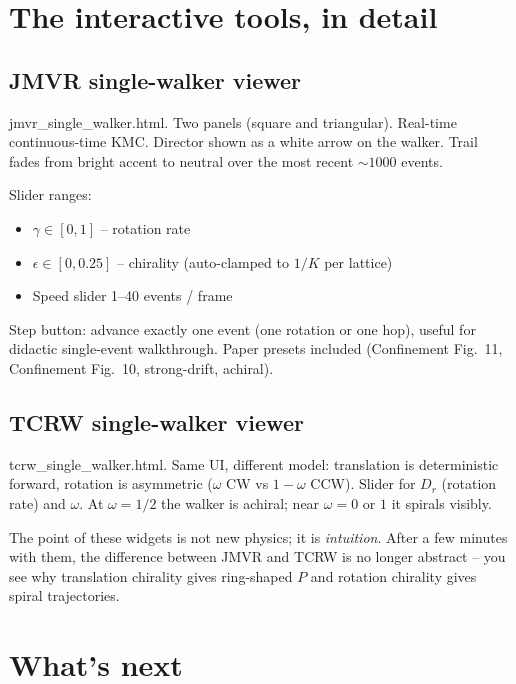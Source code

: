 \documentclass[11pt,a4paper]{article}
\begin{document}
\section{The interactive tools, in detail}\label{sec:widgets-detail}

\subsection{JMVR single-walker viewer}\label{ssec:jmvr-widget}

\textsf{jmvr\_single\_walker.html}. Two panels (square and triangular).
Real-time continuous-time KMC. Director shown as a white arrow on the
walker. Trail fades from bright accent to neutral over the most recent
$\sim 1000$ events.

Slider ranges:
\begin{itemize}[leftmargin=*,nosep]
\item $\gamma \in [0, 1]$ -- rotation rate
\item $\epsilon \in [0, 0.25]$ -- chirality (auto-clamped to $1/K$ per lattice)
\item Speed slider 1--40 events / frame
\end{itemize}

Step button: advance exactly one event (one rotation or one hop), useful
for didactic single-event walkthrough. Paper presets included
(Confinement Fig.~11, Confinement Fig.~10, strong-drift, achiral).

\subsection{TCRW single-walker viewer}\label{ssec:tcrw-widget}

\textsf{tcrw\_single\_walker.html}. Same UI, different model:
translation is deterministic forward, rotation is asymmetric ($\omega$
CW vs $1-\omega$ CCW). Slider for $D_r$ (rotation rate) and $\omega$.
At $\omega = 1/2$ the walker is achiral; near $\omega = 0$ or $1$ it
spirals visibly.

The point of these widgets is not new physics; it is \emph{intuition}.
After a few minutes with them, the difference between JMVR and TCRW is
no longer abstract -- you see why translation chirality gives
ring-shaped $P$ and rotation chirality gives spiral trajectories.

\section{What's next}\label{sec:whats-next}
\end{document}
